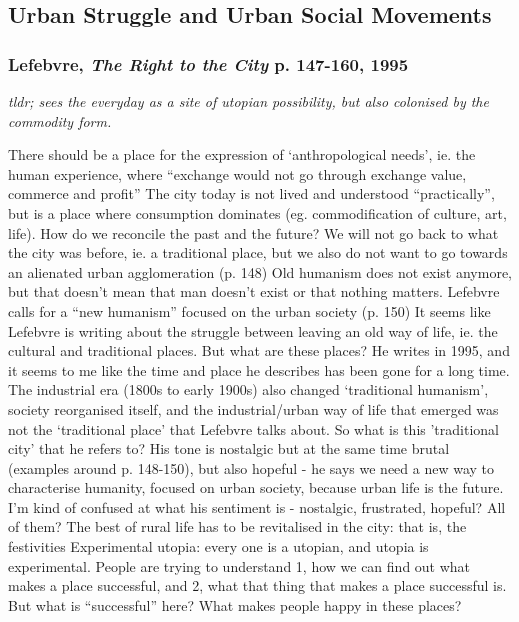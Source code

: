 \documentclass{article}
\begin{document}
\subsection{Urban Struggle and Urban Social Movements}


\subsubsection{Lefebvre, \textit{The Right to the City} p. 147-160, 1995}

\textit{tldr; sees the everyday as a site of utopian possibility, but also colonised by the commodity form.}

\begin{outline}
	\1 There should be a place for the expression of `anthropological needs', ie. the human experience, where ``exchange would not go through exchange value, commerce and profit''
	\1 The city today is not lived and understood ``practically'', but is a place where consumption dominates (eg. commodification of culture, art, life). How do we reconcile the past and the future? We will not go back to what the city was before, ie. a traditional place, but we also do not want to go towards an alienated urban agglomeration (p. 148)
	\1 Old humanism does not exist anymore, but that doesn't mean that man doesn't exist or that nothing matters. Lefebvre calls for a ``new humanism'' focused on the urban society (p. 150) 
	\1 It seems like Lefebvre is writing about the struggle between leaving an old way of life, ie. the cultural and traditional places. But what are these places? He writes in 1995, and it seems to me like the time and place he describes has been gone for a long time. The industrial era (1800s to early 1900s) also changed `traditional humanism', society reorganised itself, and the industrial/urban way of life that emerged was not the `traditional place' that Lefebvre talks about. So what is this 'traditional city' that he refers to?
	His tone is nostalgic but at the same time brutal (examples around p. 148-150), but also hopeful - he says we need a new way to characterise humanity, focused on urban society, because urban life is the future. I'm kind of confused at what his sentiment is - nostalgic, frustrated, hopeful? All of them? 
	\1 The best of rural life has to be revitalised in the city: that is, the festivities 
	\1 Experimental utopia: every one is a utopian, and utopia is experimental. People are trying to understand 1, how we can find out what  makes a place successful, and 2, what that thing that makes a place successful is. But what is ``successful'' here? What makes people happy in these places?

\end{outline}
\end{document}
